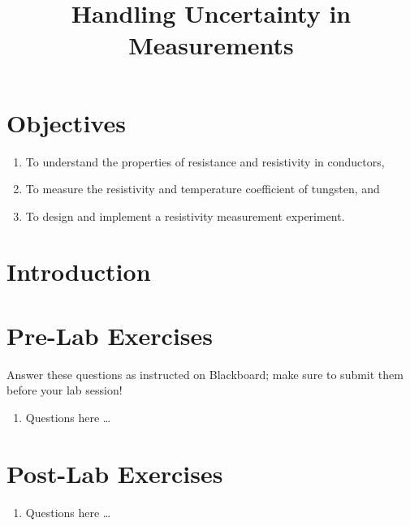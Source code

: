 \documentclass[12pt]{article}
\title{Handling Uncertainty in Measurements}
\author{}
\date{}
\begin{document}
\maketitle

\section{Objectives}
\label{sec:objectives}

\begin{enumerate}
\item To understand the properties of resistance and resistivity in
  conductors, 
\item To measure the resistivity and temperature coefficient of
  tungsten, and
\item To design and implement a resistivity measurement experiment. 
\end{enumerate}

\section{Introduction}
\label{sec:introduction}


\newpage

\section*{Pre-Lab Exercises}

Answer these questions as instructed on Blackboard; make sure to
submit them before your lab session!

\begin{enumerate}
\item Questions here \ldots
\end{enumerate}

\newpage

\section*{Post-Lab Exercises}

\begin{enumerate}
\item Questions here \ldots
\end{enumerate}
\end{document}
